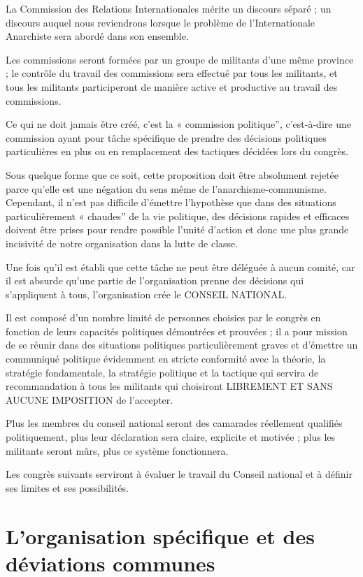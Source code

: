 La Commission des Relations Internationales mérite un discours séparé ; un discours auquel nous reviendrons lorsque le problème de l'Internationale Anarchiste sera abordé dans son ensemble.

Les commissions seront formées par un groupe de militants d'une même province ; le contrôle du travail des commissions sera effectué par tous les militants, et tous les militants participeront de manière active et productive au travail des commissions.

Ce qui ne doit jamais être créé, c'est la « commission politique'', c'est-à-dire une commission ayant pour tâche spécifique de prendre des décisions politiques particulières en plus ou en remplacement des tactiques décidées lors du congrès.

Sous quelque forme que ce soit, cette proposition doit être absolument rejetée parce qu'elle est une négation du sens même de l'anarchisme-communisme. Cependant, il n'est pas difficile d'émettre l'hypothèse que dans des situations particulièrement « chaudes'' de la vie politique, des décisions rapides et efficaces doivent être prises pour rendre possible l'unité d'action et donc une plus grande incisivité de notre organisation dans la lutte de classe.

Une fois qu'il est établi que cette tâche ne peut être déléguée à aucun comité, car il est absurde qu'une partie de l'organisation prenne des décisions qui s'appliquent à tous, l'organisation crée le CONSEIL NATIONAL.

Il est composé d'un nombre limité de personnes choisies par le congrès en fonction de leurs capacités politiques démontrées et prouvées ; il a pour mission de se réunir dans des situations politiques particulièrement graves et d'émettre un communiqué politique évidemment en stricte conformité avec la théorie, la stratégie fondamentale, la stratégie politique et la tactique qui servira de recommandation à tous les militants qui choisiront LIBREMENT ET SANS AUCUNE IMPOSITION de l'accepter.

Plus les membres du conseil national seront des camarades réellement qualifiés politiquement, plus leur déclaration sera claire, explicite et motivée ; plus les militants seront mûrs, plus ce système fonctionnera.

Les congrès suivants serviront à évaluer le travail du Conseil national et à définir ses limites et ses possibilités.

\chapter{L'organisation spécifique et des déviations communes}\hypertarget{lorganisation-spcifique-et-des-dviations-communes}{}\label{lorganisation-spcifique-et-des-dviations-communes}


